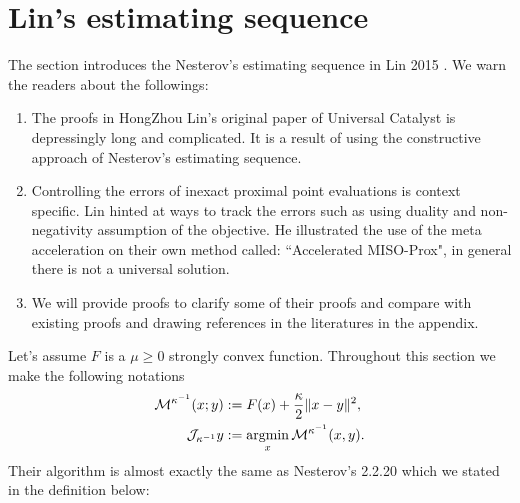 \documentclass[12pt]{article}
\begin{document}
\section{Lin's estimating sequence}\label{sec:lin-2015}
    The section introduces the Nesterov's estimating sequence in Lin 2015 \cite{lin_universal_2015}. 
    We warn the readers about the followings: 
    \begin{enumerate}
        \item The proofs in HongZhou Lin's original paper of Universal Catalyst is depressingly long and complicated. It is a result of using the constructive approach of Nesterov's estimating sequence. 
        \item Controlling the errors of inexact proximal point evaluations is context specific. Lin hinted at ways to track the errors such as using duality and non-negativity assumption of the objective. He illustrated the use of the meta acceleration on their own method called: ``Accelerated MISO-Prox", in general there is not a universal solution. 
        \item We will provide proofs to clarify some of their proofs and compare with existing proofs and drawing references in the literatures in the appendix. 
    \end{enumerate}
    Let's assume $F$ is a $\mu \ge 0$ strongly convex function. 
    Throughout this section we make the following notations
    \begin{align*}
        \mathcal M^{\kappa^{-1}}(x; y) &:= F(x) + \frac{\kappa}{2}\Vert x - y\Vert^2, 
        \\
        \mathcal J_{\kappa^{-1}} y &:= \mathop{\rm argmin}\limits_x \mathcal M^{\kappa^{-1}} (x, y). 
    \end{align*}
    Their algorithm is almost exactly the same as Nesterov's 2.2.20 \cite{nesterov_lectures_2018} which we stated in the definition below: 
\end{document}
